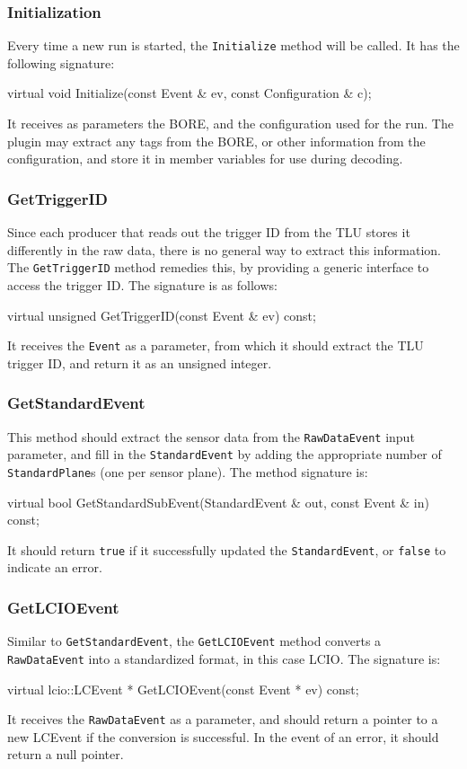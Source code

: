\subsubsection{Initialization}
Every time a new run is started, the \texttt{Initialize} method will be called.
It has the following signature:
\begin{listing}
virtual void Initialize(const Event & ev, const Configuration & c);
\end{listing}

It receives as parameters the \gls{BORE}, and the configuration used for the run.
The plugin may extract any tags from the \gls{BORE}, or other information from the configuration,
and store it in member variables for use during decoding.

\subsubsection{GetTriggerID}
Since each producer that reads out the trigger ID from the \gls{TLU} stores it differently in the raw data,
there is no general way to extract this information.
The \texttt{GetTriggerID} method remedies this, by providing a generic interface to access the trigger ID.
The signature is as follows:
\begin{listing}
virtual unsigned GetTriggerID(const Event & ev) const;
\end{listing}

It receives the \texttt{Event} as a parameter, from which it should extract the \gls{TLU} trigger ID,
and return it as an unsigned integer.

\subsubsection{GetStandardEvent}
This method should extract the sensor data from the \texttt{RawDataEvent} input parameter,
and fill in the \texttt{StandardEvent} by adding the appropriate number of \texttt{StandardPlane}s
(one per sensor plane).
The method signature is:
\begin{listing}
virtual bool GetStandardSubEvent(StandardEvent & out,
                                 const Event & in) const;
\end{listing}

It should return \texttt{true} if it successfully updated the \texttt{StandardEvent}, or \texttt{false} to indicate an error.

\subsubsection{GetLCIOEvent}
Similar to \texttt{GetStandardEvent}, the \texttt{GetLCIOEvent} method converts a \texttt{RawDataEvent}
into a standardized format, in this case \gls{LCIO}.
The signature is:
\begin{listing}
virtual lcio::LCEvent * GetLCIOEvent(const Event * ev) const;
\end{listing}

It receives the \texttt{RawDataEvent} as a parameter, and should return a pointer to a new LCEvent
if the conversion is successful. In the event of an error, it should return a null pointer.
